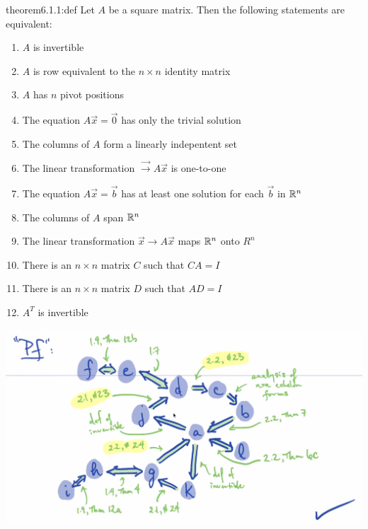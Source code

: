 \begin{theorem}{theorem6.1.1:def}
    Let $A$ be a square matrix. Then the following statements are equivalent:

    \begin{enumerate}
        \item $A$ is invertible
        \item $A$ is row equivalent to the $n\times n$ identity matrix
        \item $A$ has $n$ pivot positions
        \item The equation $A\vec{x} = \vec{0}$ has only the trivial solution
        \item The columns of $A$ form a linearly indepentent set
        \item The linear transformation $\vec \rightarrow A\vec{x}$ is one-to-one
        \item The equation $A\vec{x} = \vec{b}$ has at least one solution for each $\vec{b}$ in $\mathbb{R}^n$
        \item The columns of $A$ span $\mathbb{R}^n$
        \item The linear transformation $\vec{x} \rightarrow A\vec{x}$ maps $\mathbb{R}^n$ onto $R^n$
        \item There is an $n\times n$ matrix $C$ such that $CA = I$
        \item There is an $n\times n$ matrix $D$ such that $AD = I$
        \item $A^T$ is invertible
    \end{enumerate}
\end{theorem}

    \begin{center}
        \includegraphics[width=1\textwidth]{chapters/ch6/images/fig6.1.PNG}
    \end{center}